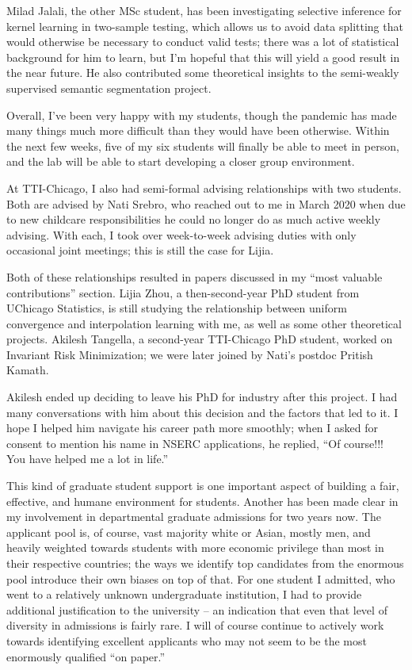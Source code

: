 \documentclass[12pt]{article}
\begin{document}
{{{{Milad Jalali, the other MSc student, has been investigating selective inference for kernel learning in two-sample testing, which allows us to avoid data splitting that would otherwise be necessary to conduct valid tests; there was a lot of statistical background for him to learn, but I'm hopeful that this will yield a good result in the near future. He also contributed some theoretical insights to the semi-weakly supervised semantic segmentation project.

Overall, I've been very happy with my students, though the pandemic has made many things much more difficult than they would have been otherwise. Within the next few weeks, five of my six students will finally be able to meet in person, and the lab will be able to start developing a closer group environment.

At TTI-Chicago, I also had semi-formal advising relationships with two students. Both are advised by Nati Srebro, who reached out to me in March 2020 when due to new childcare responsibilities he could no longer do as much active weekly advising. With each, I took over week-to-week advising duties with only occasional joint meetings; this is still the case for Lijia.

Both of these relationships resulted in papers discussed in my ``most valuable contributions'' section.
Lijia Zhou, a then-second-year PhD student from UChicago Statistics, is still studying the relationship between uniform convergence and interpolation learning with me, as well as some other theoretical projects. Akilesh Tangella, a second-year TTI-Chicago PhD student, worked on Invariant Risk Minimization; we were later joined by Nati's postdoc Pritish Kamath.

Akilesh ended up deciding to leave his PhD for industry after this project. I had many conversations with him about this decision and the factors that led to it. I hope I helped him navigate his career path more smoothly; when I asked for consent to mention his name in NSERC applications, he replied, ``Of course!!! You have helped me a lot in life.''

This kind of graduate student support is one important aspect of building a fair, effective, and humane environment for students. Another has been made clear in my involvement in departmental graduate admissions for two years now. The applicant pool is, of course, vast majority white or Asian, mostly men, and heavily weighted towards students with more economic privilege than most in their respective countries; the ways we identify top candidates from the enormous pool introduce their own biases on top of that. For one student I admitted, who went to a relatively unknown undergraduate institution, I had to provide additional justification to the university -- an indication that even that level of diversity in admissions is fairly rare. I will of course continue to actively work towards identifying excellent applicants who may not seem to be the most enormously qualified ``on paper.''

}}}}
\end{document}
